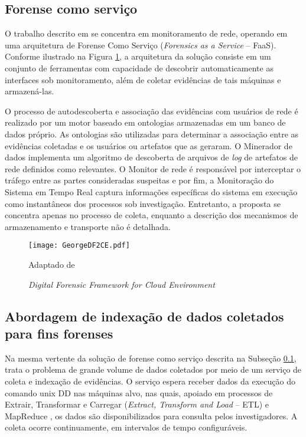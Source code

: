\subsection{Forense como serviço}
\label{sec:frost}

O trabalho descrito em \cite{GeorgeDF2CE:2012} se concentra em monitoramento de rede, operando em uma arquitetura de Forense Como Serviço (\textit{Forensics as a Service} -- FaaS). 
%
Conforme ilustrado na Figura \ref{fig:GeorgeDF2CE}, a arquitetura da solução consiste em um conjunto de ferramentas com capacidade de descobrir automaticamente as interfaces sob monitoramento, além de coletar evidências de tais máquinas e armazená-las.


O processo de autodescoberta e associação das evidências com usuários de rede é realizado por um motor baseado em ontologias armazenadas em um banco de dados próprio. 
%
As ontologias são utilizadas para determinar a associação entre as evidências coletadas e os usuários ou artefatos que as geraram.
%
O Minerador de dados implementa um algoritmo de descoberta de arquivos de \textit{log} de artefatos de rede definidos como relevantes.
%
O Monitor de rede é responsável por interceptar o tráfego entre as partes consideradas suspeitas e por fim, a Monitoração do Sistema em Tempo Real captura informações específicas do sistema em execução como instantâneos dos processos sob investigação.
%
Entretanto, a proposta se concentra apenas no processo de coleta, enquanto a descrição dos mecanismos de armazenamento e transporte não é detalhada.


\begin{figure}[htb!]
\footnotesize
\caption{\textit{Digital Forensic Framework for Cloud Environment}}
\texttt{[image: GeorgeDF2CE.pdf]}
\centering
\label{fig:GeorgeDF2CE}
\begin{center}
Adaptado de \cite{GeorgeDF2CE:2012} 
\end{center}
\end{figure}


\subsection{Abordagem de indexação de dados coletados para fins forenses}
\label{sec:indexacaoforense}

Na mesma vertente da solução de forense como serviço descrita na Subseção \ref{sec:frost}, \cite{FaaSIndexedSearch:2012} trata o problema de grande volume de dados coletados por meio de um serviço de coleta e indexação de evidências.
%
O serviço espera receber dados da execução do comando unix DD \cite{UnixManPagesDD} nas máquinas alvo, nas quais, apoiado em processos de Extrair, Transformar e Carregar (\textit{Extract, Transform and Load} -- ETL) e MapReduce \cite{MapReduce:2008}, os dados são disponibilizados para consulta pelos investigadores.
%
A coleta ocorre continuamente, em intervalos de tempo configuráveis.


